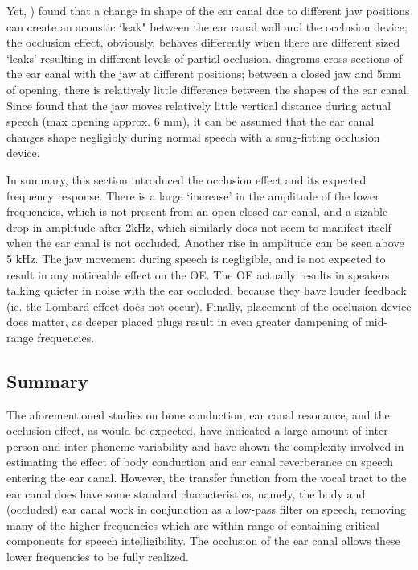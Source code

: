 Yet, \cite{hansen:97b}) found that a change in shape of the ear canal due to different jaw positions can create an acoustic `leak" between the ear canal wall and the occlusion device; the occlusion effect, obviously, behaves differently when there are different sized `leaks' resulting in different levels of partial occlusion. 
\cite{hansen:97b} diagrams cross sections of the ear canal with the jaw at different positions; between a closed jaw and 5mm of opening, there is relatively little difference between the shapes of the ear canal.  Since \cite{borghese:97} found that the jaw moves relatively little vertical distance during actual speech (max opening approx. 6 mm), it can be assumed that the ear canal changes shape negligibly during normal speech with a snug-fitting occlusion device. 

In summary, %
this section introduced the occlusion effect and its expected frequency response.  There is a large `increase' in the amplitude of the lower frequencies, which is not present from an open-closed ear canal, and a sizable drop in amplitude after 2kHz, which similarly does not seem to manifest itself when the ear canal is not occluded.  Another rise in amplitude can be seen above 5 kHz.  The jaw movement during speech is negligible, and is not expected to result in any noticeable effect on the OE.  The OE actually results in speakers talking quieter in noise with the ear occluded, because they have louder feedback (ie. the Lombard effect does not occur).  Finally, placement of the occlusion device does matter, as deeper placed plugs result in even greater dampening of mid-range frequencies.


\subsection{Summary}

The aforementioned studies on bone conduction, ear canal resonance, and the occlusion effect, as would be expected, have indicated a large amount of inter-person and inter-phoneme variability and have shown the complexity involved in estimating the effect of body conduction and ear canal reverberance on speech entering the ear canal.  However, the transfer function from the vocal tract to the ear canal does have some standard characteristics, namely, the body and (occluded) ear canal work in conjunction as a low-pass filter on speech, removing many of the higher frequencies which are within range of containing critical components for speech intelligibility.  The occlusion of the ear canal allows these lower frequencies to be fully realized.

